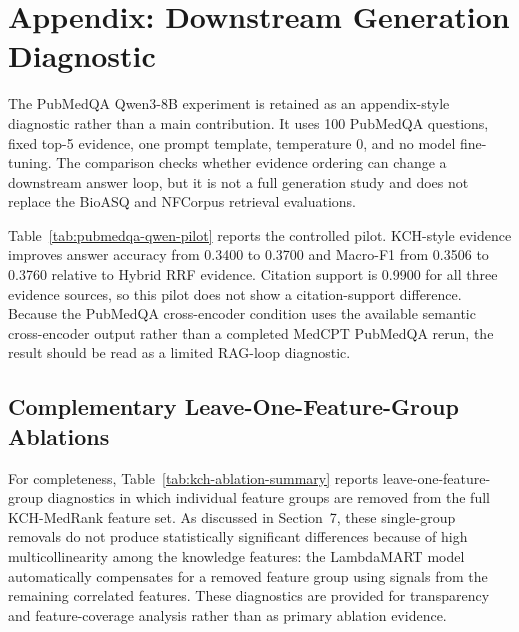 \section{Appendix: Downstream Generation Diagnostic}

The PubMedQA Qwen3-8B experiment is retained as an appendix-style diagnostic rather than a main contribution. It uses 100 PubMedQA questions, fixed top-5 evidence, one prompt template, temperature 0, and no model fine-tuning. The comparison checks whether evidence ordering can change a downstream answer loop, but it is not a full generation study and does not replace the BioASQ and NFCorpus retrieval evaluations.

Table~\ref{tab:pubmedqa-qwen-pilot} reports the controlled pilot. KCH-style evidence improves answer accuracy from 0.3400 to 0.3700 and Macro-F1 from 0.3506 to 0.3760 relative to Hybrid RRF evidence. Citation support is 0.9900 for all three evidence sources, so this pilot does not show a citation-support difference. Because the PubMedQA cross-encoder condition uses the available semantic cross-encoder output rather than a completed MedCPT PubMedQA rerun, the result should be read as a limited RAG-loop diagnostic.



\subsection{Complementary Leave-One-Feature-Group Ablations}

For completeness, Table~\ref{tab:kch-ablation-summary} reports leave-one-feature-group diagnostics in which individual feature groups are removed from the full KCH-MedRank feature set. As discussed in Section~7, these single-group removals do not produce statistically significant differences because of high multicollinearity among the knowledge features: the LambdaMART model automatically compensates for a removed feature group using signals from the remaining correlated features. These diagnostics are provided for transparency and feature-coverage analysis rather than as primary ablation evidence.


